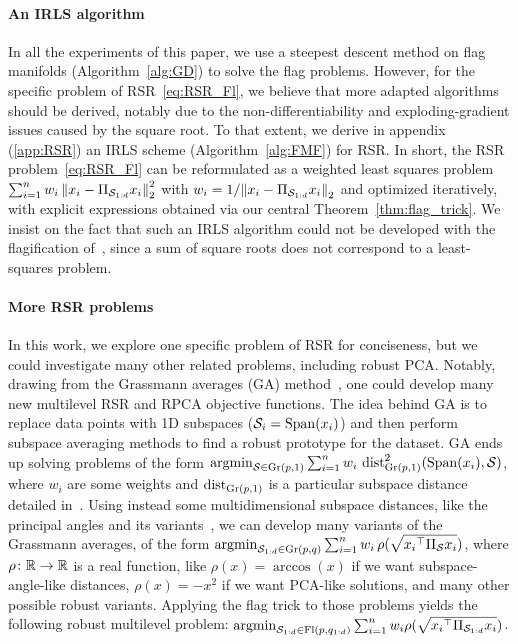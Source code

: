 \paragraph{An IRLS algorithm}
In all the experiments of this paper, we use a steepest descent method on flag manifolds (Algorithm~\ref{alg:GD}) to solve the flag problems.
However, for the specific problem of RSR~\eqref{eq:RSR_Fl}, we believe that more adapted algorithms should be derived, notably due to the non-differentiability and exploding-gradient issues caused by the square root.
To that extent, we derive in appendix (\autoref{app:RSR}) an IRLS scheme (Algorithm~\ref{alg:FMF}) for RSR. In short, the RSR problem~\eqref{eq:RSR_Fl} can be reformulated as a weighted least squares problem $\sum_{i=1}^n w_i \norm{x_i - \Pi_{\Sf} x_i}_2^2$ with $w_i ={1}/{\norm{x_i - \Pi_{\Sf} x_i}_2}$ and optimized iteratively, with explicit expressions obtained via our central Theorem~\ref{thm:flag_trick}. We insist on the fact that such an IRLS algorithm could not be developed with the flagification of~\citet{pennec_barycentric_2018,mankovich_fun_2024}, since a sum of square roots does not correspond to a least-squares problem.

\paragraph{More RSR problems}
In this work, we explore one specific problem of RSR for conciseness, but we could investigate many other related problems, including robust PCA. 
Notably, drawing from the Grassmann averages (GA) method~\citep{hauberg_scalable_2016}, one could develop many new multilevel RSR and RPCA objective functions.
The idea behind GA is to replace data points with 1D subspaces ($\S_i = \operatorname{Span}(x_i)$) and then perform subspace averaging methods to find a robust prototype for the dataset. GA ends up solving problems of the form $\operatorname{argmin}_{\S \in \Gr(p, 1)} \sum_{i=1}^n w_i \, \operatorname{dist}_{\Gr(p, 1)}^2(\operatorname{Span}(x_i), \S)$, where $w_i$ are some weights and $\operatorname{dist}_{\Gr(p, 1)}$ is a particular subspace distance detailed in~\citet{hauberg_scalable_2016}. Using instead some multidimensional subspace distances, like the principal angles and its variants~\citep{hamm_grassmann_2008, ye_schubert_2016}, we can develop many variants of the Grassmann averages, of the form $\operatorname{argmin}_{\Sf \in\Gr(p, q)} \sum_{i=1}^n w_i \, \rho(\sqrt{{x_i}\T  \Pi_{\S} {x_i}})$, where $\rho\colon\R\to\R$ is a real function, like $\rho(x) = \arccos(x)$ if we want subspace-angle-like distances, $\rho(x) = - x^2$ if we want PCA-like solutions, and many other possible robust variants.
Applying the flag trick to those problems yields the following robust multilevel problem: $\operatorname{argmin}_{\Sf \in\Fl(p, \qf)} \sum_{i=1}^n w_i \rho(\sqrt{{x_i}\T  \Pi_{\Sf} {x_i}})$.